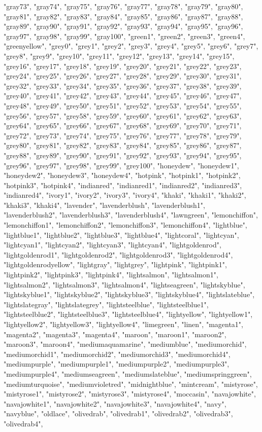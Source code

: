 \begin{itemize}
\begin{itemize}
"gray73", "gray74", "gray75", "gray76", "gray77", "gray78", "gray79", "gray80", "gray81", "gray82", "gray83", "gray84", "gray85", "gray86", "gray87", "gray88", "gray89", "gray90", "gray91", "gray92", "gray93", "gray94", "gray95", "gray96", "gray97", "gray98", "gray99", "gray100", "green1", "green2", "green3", "green4", "greenyellow", "grey0", "grey1", "grey2", "grey3", "grey4", "grey5", "grey6", "grey7", "grey8", "grey9", "grey10", "grey11", "grey12", "grey13", "grey14", "grey15", "grey16", "grey17", "grey18", "grey19", "grey20", "grey21", "grey22", "grey23", "grey24", "grey25", "grey26", "grey27", "grey28", "grey29", "grey30", "grey31", "grey32", "grey33", "grey34", "grey35", "grey36", "grey37", "grey38", "grey39", "grey40", "grey41", "grey42", "grey43", "grey44", "grey45", "grey46", "grey47", "grey48", "grey49", "grey50", "grey51", "grey52", "grey53", "grey54", "grey55", "grey56", "grey57", "grey58", "grey59", "grey60", "grey61", "grey62", "grey63", "grey64", "grey65", "grey66", "grey67", "grey68", "grey69", "grey70", "grey71", "grey72", "grey73", "grey74", "grey75", "grey76", "grey77", "grey78", "grey79", "grey80", "grey81", "grey82", "grey83", "grey84", "grey85", "grey86", "grey87", "grey88", "grey89", "grey90", "grey91", "grey92", "grey93", "grey94", "grey95", "grey96", "grey97", "grey98", "grey99", "grey100", "honeydew", "honeydew1", "honeydew2", "honeydew3", "honeydew4", "hotpink", "hotpink1", "hotpink2", "hotpink3", "hotpink4", "indianred", "indianred1", "indianred2", "indianred3", "indianred4", "ivory1", "ivory2", "ivory3", "ivory4", "khaki", "khaki1", "khaki2", "khaki3", "khaki4", "lavender", "lavenderblush", "lavenderblush1", "lavenderblush2", "lavenderblush3", "lavenderblush4", "lawngreen", "lemonchiffon", "lemonchiffon1", "lemonchiffon2", "lemonchiffon3", "lemonchiffon4", "lightblue", "lightblue1", "lightblue2", "lightblue3", "lightblue4", "lightcoral", "lightcyan", "lightcyan1", "lightcyan2", "lightcyan3", "lightcyan4", "lightgoldenrod", "lightgoldenrod1", "lightgoldenrod2", "lightgoldenrod3", "lightgoldenrod4", "lightgoldenrodyellow", "lightgray", "lightgrey", "lightpink", "lightpink1", "lightpink2", "lightpink3", "lightpink4", "lightsalmon", "lightsalmon1", "lightsalmon2", "lightsalmon3", "lightsalmon4", "lightseagreen", "lightskyblue", "lightskyblue1", "lightskyblue2", "lightskyblue3", "lightskyblue4", "lightslateblue", "lightslategray", "lightslategrey", "lightsteelblue", "lightsteelblue1", "lightsteelblue2", "lightsteelblue3", "lightsteelblue4", "lightyellow", "lightyellow1", "lightyellow2", "lightyellow3", "lightyellow4", "limegreen", "linen", "magenta1", "magenta2", "magenta3", "magenta4", "maroon", "maroon1", "maroon2", "maroon3", "maroon4", "mediumaquamarine", "mediumblue", "mediumorchid", "mediumorchid1", "mediumorchid2", "mediumorchid3", "mediumorchid4", "mediumpurple", "mediumpurple1", "mediumpurple2", "mediumpurple3", "mediumpurple4", "mediumseagreen", "mediumslateblue", "mediumspringgreen", "mediumturquoise", "mediumvioletred", "midnightblue", "mintcream", "mistyrose", "mistyrose1", "mistyrose2", "mistyrose3", "mistyrose4", "moccasin", "navajowhite", "navajowhite1", "navajowhite2", "navajowhite3", "navajowhite4", "navy", "navyblue", "oldlace", "olivedrab", "olivedrab1", "olivedrab2", "olivedrab3", "olivedrab4", 
\end{itemize}
\end{itemize}
